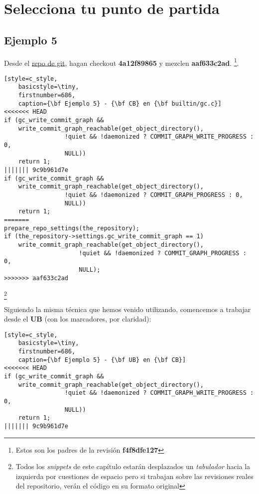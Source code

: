 
\section{Selecciona tu punto de partida}

\subsection{Ejemplo 5}
\label{example_05}

Desde el \hyperref[git_repo]{repo de git}, hagan checkout {\bf 4a12f89865} y mezclen {\bf aaf633c2ad}.
\footnote{Estos son los padres de la revisión {\bf f4f8dfe127}}.

\begin{lstlisting}[style=c_style,
	basicstyle=\tiny,
	firstnumber=686,
	caption={\bf Ejemplo 5} - {\bf CB} en {\bf builtin/gc.c}]
<<<<<<< HEAD
if (gc_write_commit_graph &&
    write_commit_graph_reachable(get_object_directory(),
				 !quiet && !daemonized ? COMMIT_GRAPH_WRITE_PROGRESS : 0,
				 NULL))
	return 1;
||||||| 9c9b961d7e
if (gc_write_commit_graph &&
    write_commit_graph_reachable(get_object_directory(),
				 !quiet && !daemonized ? COMMIT_GRAPH_PROGRESS : 0,
				 NULL))
	return 1;
=======
prepare_repo_settings(the_repository);
if (the_repository->settings.gc_write_commit_graph == 1)
	write_commit_graph_reachable(get_object_directory(),
				     !quiet && !daemonized ? COMMIT_GRAPH_PROGRESS : 0,
				     NULL);
>>>>>>> aaf633c2ad
\end{lstlisting}\footnote{Todos los {\it snippets} de este capítulo estarán desplazados un {\it tabulador} hacia
la izquierda por cuestiones de espacio pero si trabajan sobre las revisiones reales del repositorio, verán el código
en su formato original}

Siguiendo la misma técnica que hemos venido utilizando, comencemos a trabajar desde el {\bf UB} (con los
marcadores, por claridad):

\begin{lstlisting}[style=c_style,
	basicstyle=\tiny,
	firstnumber=686,
	caption={\bf Ejemplo 5} - {\bf UB} en {\bf CB}]
<<<<<<< HEAD
if (gc_write_commit_graph &&
    write_commit_graph_reachable(get_object_directory(),
				 !quiet && !daemonized ? COMMIT_GRAPH_WRITE_PROGRESS : 0,
				 NULL))
	return 1;
||||||| 9c9b961d7e
\end{lstlisting}

